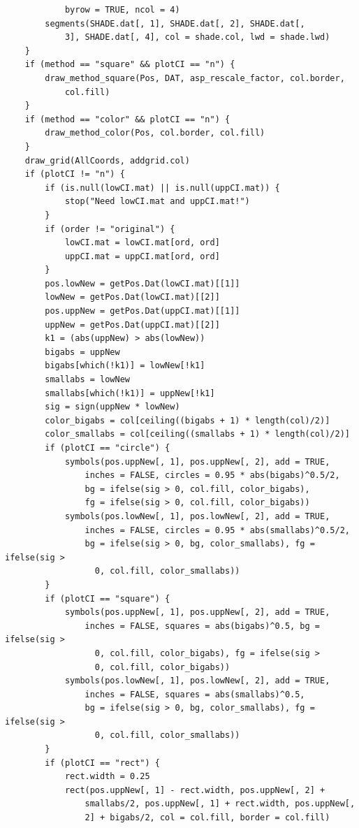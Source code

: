 \documentclass[
]{article}
\begin{document}
\begin{verbatim}
            byrow = TRUE, ncol = 4)
        segments(SHADE.dat[, 1], SHADE.dat[, 2], SHADE.dat[, 
            3], SHADE.dat[, 4], col = shade.col, lwd = shade.lwd)
    }
    if (method == "square" && plotCI == "n") {
        draw_method_square(Pos, DAT, asp_rescale_factor, col.border, 
            col.fill)
    }
    if (method == "color" && plotCI == "n") {
        draw_method_color(Pos, col.border, col.fill)
    }
    draw_grid(AllCoords, addgrid.col)
    if (plotCI != "n") {
        if (is.null(lowCI.mat) || is.null(uppCI.mat)) {
            stop("Need lowCI.mat and uppCI.mat!")
        }
        if (order != "original") {
            lowCI.mat = lowCI.mat[ord, ord]
            uppCI.mat = uppCI.mat[ord, ord]
        }
        pos.lowNew = getPos.Dat(lowCI.mat)[[1]]
        lowNew = getPos.Dat(lowCI.mat)[[2]]
        pos.uppNew = getPos.Dat(uppCI.mat)[[1]]
        uppNew = getPos.Dat(uppCI.mat)[[2]]
        k1 = (abs(uppNew) > abs(lowNew))
        bigabs = uppNew
        bigabs[which(!k1)] = lowNew[!k1]
        smallabs = lowNew
        smallabs[which(!k1)] = uppNew[!k1]
        sig = sign(uppNew * lowNew)
        color_bigabs = col[ceiling((bigabs + 1) * length(col)/2)]
        color_smallabs = col[ceiling((smallabs + 1) * length(col)/2)]
        if (plotCI == "circle") {
            symbols(pos.uppNew[, 1], pos.uppNew[, 2], add = TRUE, 
                inches = FALSE, circles = 0.95 * abs(bigabs)^0.5/2, 
                bg = ifelse(sig > 0, col.fill, color_bigabs), 
                fg = ifelse(sig > 0, col.fill, color_bigabs))
            symbols(pos.lowNew[, 1], pos.lowNew[, 2], add = TRUE, 
                inches = FALSE, circles = 0.95 * abs(smallabs)^0.5/2, 
                bg = ifelse(sig > 0, bg, color_smallabs), fg = ifelse(sig > 
                  0, col.fill, color_smallabs))
        }
        if (plotCI == "square") {
            symbols(pos.uppNew[, 1], pos.uppNew[, 2], add = TRUE, 
                inches = FALSE, squares = abs(bigabs)^0.5, bg = ifelse(sig > 
                  0, col.fill, color_bigabs), fg = ifelse(sig > 
                  0, col.fill, color_bigabs))
            symbols(pos.lowNew[, 1], pos.lowNew[, 2], add = TRUE, 
                inches = FALSE, squares = abs(smallabs)^0.5, 
                bg = ifelse(sig > 0, bg, color_smallabs), fg = ifelse(sig > 
                  0, col.fill, color_smallabs))
        }
        if (plotCI == "rect") {
            rect.width = 0.25
            rect(pos.uppNew[, 1] - rect.width, pos.uppNew[, 2] + 
                smallabs/2, pos.uppNew[, 1] + rect.width, pos.uppNew[, 
                2] + bigabs/2, col = col.fill, border = col.fill)

\end{verbatim}
\end{document}
